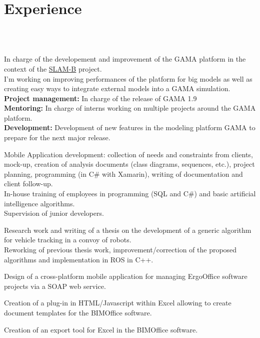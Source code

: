 \documentclass[letterpaper]{twentysecondcv - EN} %
\begin{document}
\section{Experience}
\\
\begin{twenty}
\\
	{
		In charge of the developement and improvement of the GAMA platform in the context of the \href{https://www.slamb.fr/}{SLAM-B} project.\\
		I'm working on improving performances of the platform for big models as well as creating easy ways to integrate external models into a GAMA simulation.
	}
	{
		\textbf{Project management:} In charge of the release of GAMA 1.9\\
		\textbf{Mentoring:} In charge of interns working on multiple projects around the GAMA platform.\\
		 \textbf{Development:} Development of new features in the modeling platform GAMA to prepare for the next major release.
	}
	
	{ 
		Mobile Application development: collection of needs and constraints from clients, mock-up, creation of analysis documents (class diagrams, sequences, etc.), project planning, programming (in C\# with Xamarin), writing of documentation and client follow-up.\\
		In-house training of employees in programming (SQL and C\#) and basic artificial intelligence algorithms. \\
		Supervision of junior developers.
	}
	 
	{
		Research work and writing of a thesis on the development of a generic algorithm for vehicle tracking in a convoy of robots. \\
		Reworking of previous thesis work, improvement/correction of the proposed algorithms and implementation in ROS in C++.
	}
	
	{
		Design of a cross-platform mobile application for managing ErgoOffice software projects via a SOAP web service.
	}
	
	{
		Creation of a plug-in in HTML/Javascript within Excel allowing to create document templates for the BIMOffice software.
	}

	
	{
		Creation of an export tool for Excel in the BIMOffice software.
	}

\end{twenty}
\end{document}
